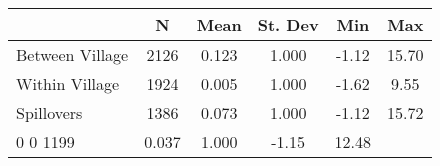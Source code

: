 \begin{tabular}{l*{5}{c}}\hline&\multicolumn{1}{c}{N}&\multicolumn{1}{c}{Mean}&\multicolumn{1}{c}{St. Dev}&\multicolumn{1}{c}{Min}&\multicolumn{1}{c}{Max}\\ \hline 
Between Village & 2126 & 0.123 & 1.000 & -1.12 & 15.70 \\
Within Village & 1924 & 0.005 & 1.000 & -1.62 & 9.55 \\
Spillovers & 1386 & 0.073 & 1.000 & -1.12 & 15.72 \\
0 0 1199 & 0.037 & 1.000 & -1.15 & 12.48 \\
\hline \end{tabular}
